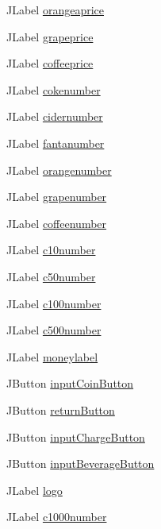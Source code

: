 \begin{DoxyCompactItemize}
J\+Label \hyperlink{class_vending_machine_1_1_machine_u_i_ac8f6bb93109b80f848429fc8d72d167b}{orangeaprice}
\item 
J\+Label \hyperlink{class_vending_machine_1_1_machine_u_i_ab18de7006b9426b82266463a305ff30e}{grapeprice}
\item 
J\+Label \hyperlink{class_vending_machine_1_1_machine_u_i_a07827eeed491a4ff5382507b68af2811}{coffeeprice}
\item 
J\+Label \hyperlink{class_vending_machine_1_1_machine_u_i_a902358a427129e6a67fd5ddaa92661a8}{cokenumber}
\item 
J\+Label \hyperlink{class_vending_machine_1_1_machine_u_i_a3186776304413f89f2ca3e0fcf56947b}{cidernumber}
\item 
J\+Label \hyperlink{class_vending_machine_1_1_machine_u_i_a056f7147f4c21017754a69e423de114c}{fantanumber}
\item 
J\+Label \hyperlink{class_vending_machine_1_1_machine_u_i_a031861a0a732903b63d565b0a612638f}{orangenumber}
\item 
J\+Label \hyperlink{class_vending_machine_1_1_machine_u_i_a49996fe3818b6587f54e105c41c2f0b1}{grapenumber}
\item 
J\+Label \hyperlink{class_vending_machine_1_1_machine_u_i_a56d029e587c699de6b3d8f3f2c5c3ddb}{coffeenumber}
\item 
J\+Label \hyperlink{class_vending_machine_1_1_machine_u_i_a87030fea4819a0534fe536af2084a6e5}{c10number}
\item 
J\+Label \hyperlink{class_vending_machine_1_1_machine_u_i_a41f6d6db82cc6d27f2961c71d8fff229}{c50number}
\item 
J\+Label \hyperlink{class_vending_machine_1_1_machine_u_i_a3541b20a550888418c19ed32a0d7ac10}{c100number}
\item 
J\+Label \hyperlink{class_vending_machine_1_1_machine_u_i_ab6f47810cb959c1353a04f8aba54ae21}{c500number}
\item 
J\+Label \hyperlink{class_vending_machine_1_1_machine_u_i_a9da605a2313ee30b2219bce28977b9fe}{moneylabel}
\item 
J\+Button \hyperlink{class_vending_machine_1_1_machine_u_i_a51a3894dfa3129ad9f4e385395499cc9}{input\+Coin\+Button}
\item 
J\+Button \hyperlink{class_vending_machine_1_1_machine_u_i_ad82aa0418636517fefcd1ec842d44523}{return\+Button}
\item 
J\+Button \hyperlink{class_vending_machine_1_1_machine_u_i_af087897ffa9ab50127ab87daf7fb072f}{input\+Charge\+Button}
\item 
J\+Button \hyperlink{class_vending_machine_1_1_machine_u_i_a1f437e079f7a931ee649ac03540d5f49}{input\+Beverage\+Button}
\item 
J\+Label \hyperlink{class_vending_machine_1_1_machine_u_i_af470215213c1133a4f2549d0a00b5d16}{logo}
\item 
J\+Label \hyperlink{class_vending_machine_1_1_machine_u_i_a019654970035375965815c2c6bf4fc71}{c1000number}
\end{DoxyCompactItemize}


